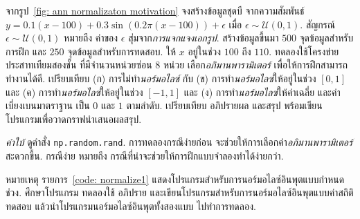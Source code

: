 \begin{Exercise}
\label{ex: ann input normalization}

จากรูป~\ref{fig: ann normalizaton motivation}	
จงสร้างข้อมูลชุดบี 
จากความสัมพันธ์
$y = 0.1 (x - 100)
+ 0.3 \sin( 0.2 \pi (x - 100) ) + \epsilon$
เมื่อ $\epsilon \sim \mathcal{U}(0,1)$.
สัญกรณ์ $\epsilon \sim \mathcal{U}(0,1)$
หมายถึง
ค่าของ $\epsilon$ สุ่มจาก\textit{การแจกแจงเอกรูป}.
%
สร้างข้อมูลขึ้นมา $500$ จุดข้อมูลสำหรับการฝึก 
และ $250$ จุดข้อมูลสำหรับการทดสอบ.
ให้ $x$ อยู่ในช่วง $100$ ถึง $110$.
ทดลองใช้โครงข่ายประสาทเทียมสองชั้น ที่มีจำนวนหน่วยซ่อน $8$ หน่วย เลือก\textit{อภิมานพารามิเตอร์} เพื่อให้การฝึกสามารถทำงานได้ดี.
เปรียบเทียบ
(ก) การไม่ทำ\textit{นอร์มอไลซ์}
กับ
(ข) การทำ\textit{นอร์มอไลซ์}ให้อยู่ในช่วง $[0,1]$
และ 
(ค) การทำ\textit{นอร์มอไลซ์}ให้อยู่ในช่วง $[-1,1]$
และ 
(ง) การทำ\textit{นอร์มอไลซ์}ให้ค่าเฉลี่ย และค่าเบี่ยงเบนมาตราฐาน เป็น $0$ และ $1$ ตามลำดับ.
เปรียบเทียบ อภิปรายผล และสรุป พร้อมเขียนโปรแกรมเพื่อวาดกราฟนำเสนอผลสรุป.

\textit{คำใบ้}
ดูคำสั่ง \verb|np.random.rand|.
การทดลองกรณีง่ายก่อน จะช่วยให้การเลือกค่า\textit{อภิมานพารามิเตอร์}สะดวกขึ้น.
กรณีง่าย หมายถึง กรณีที่น่าจะช่วยให้การฝึกแบบจำลองทำได้ง่ายกว่า.

หมายเหตุ รายการ~\ref{code: normalize1} แสดงโปรแกรมสำหรับการนอร์มอไลซ์อินพุตแบบกำหนดช่วง.
ศึกษาโปรแกรม ทดลองใช้ อภิปราย และเขียนโปรแกรมสำหรับการนอร์มอไลซ์อินพุตแบบค่าสถิติ ทดสอบ แล้วนำโปรแกรมนอร์มอไลซ์อินพุตทั้งสองแบบ ไปทำการทดลอง.


\end{Exercise}

